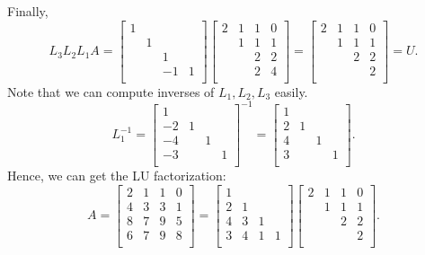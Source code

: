 Finally, 
\[
    L_3 L_2 L_1 A = \begin{bmatrix}
        1 &  &  &   \\
         & 1 &  &   \\
         &  & 1 &   \\
         &  & -1 &  1 \\
    \end{bmatrix}  \begin{bmatrix}
        2 & 1 & 1 &  0 \\
         & 1 & 1 &  1 \\
         &  & 2 &  2 \\
         &  & 2 &4   \\
     \end{bmatrix} = \begin{bmatrix}
        2 & 1 & 1 &  0 \\
         & 1 & 1 &  1 \\
         &  & 2 &  2 \\
         &  &  &  2 \\
     \end{bmatrix} = U.  
\]
Note that we can compute inverses of $L_1, L_2, L_3$ easily. 
\[
    L_1^{-1}  = \begin{bmatrix}
        1 &  &  &   \\
        -2 & 1 &  &   \\
        -4 &  & 1 &   \\
        -3 &  &  &  1 \\
    \end{bmatrix}^{-1}  = \begin{bmatrix}
        1 &  &  &   \\
        2 & 1 &  &   \\
        4 &  & 1 &   \\
        3 &  &  &  1 \\
    \end{bmatrix}.   
\]
Hence, we can get the LU factorization: 
\[
    A= \begin{bmatrix}
        2 & 1 & 1 &  0 \\
        4 & 3 & 3 &  1 \\
        8 & 7 & 9 &  5 \\
        6 & 7 & 9 &  8 \\
    \end{bmatrix}
    = 
    \begin{bmatrix}
        1 &  &  &   \\
        2 & 1 &  &   \\
        4 & 3 & 1 &   \\
        3 & 4 & 1 &  1 \\
    \end{bmatrix}
    \begin{bmatrix}
        2 & 1 & 1 &  0 \\
         & 1 & 1 &  1 \\
         &  & 2 &  2 \\
         &  &  &  2 \\
    \end{bmatrix}  . 
\]

